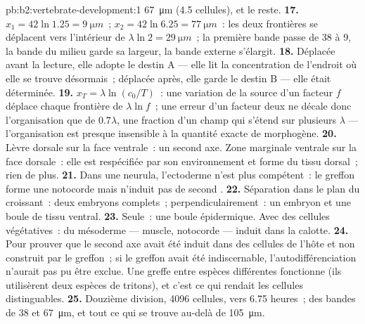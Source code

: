 \begin{solution}{pb:b2:vertebrate-development:1}
\qty{67}{\micro m} (4.5 cellules), et le reste.
\textbf{17.} $x_1 = 42\ln 1.25 = \qty{9}{\micro m}$~; $x_2 = 42\ln 6.25
= \qty{77}{\micro m}$~: les deux frontières se déplacent vers l'intérieur
de $\lambda\ln 2 =
\qty{29}{\micro m}$~; la première bande passe de 38 à 9, la bande du
milieu garde sa largeur, la bande externe s'élargit.
\textbf{18.} Déplacée avant la lecture, elle adopte le destin A ---
elle lit la concentration de l'endroit où elle se trouve désormais~;
déplacée après, elle garde le destin B --- elle était déterminée.
\textbf{19.} $x_T = \lambda\ln(c_0/T)$~: une variation de la source d'un
facteur $f$ déplace chaque frontière de $\lambda\ln f$~; une erreur d'un
facteur deux ne décale donc l'organisation que de $0.7\lambda$, une
fraction d'un champ qui s'étend sur plusieurs $\lambda$ --- l'organisation
est presque insensible à la quantité exacte de morphogène.
\textbf{20.} Lèvre dorsale sur la face ventrale~: un second axe. Zone
marginale ventrale sur la face dorsale~: elle est respécifiée par son
environnement et forme du tissu dorsal~; rien de plus.
\textbf{21.} Dans une neurula, l'ectoderme n'est plus compétent~: le
greffon forme une notocorde mais n'induit pas de second .
\textbf{22.} Séparation dans le plan du croissant~: deux embryons
complets~; perpendiculairement~: un embryon et une boule de tissu
ventral.
\textbf{23.} Seule~: une boule épidermique. Avec des cellules
végétatives~: du mésoderme --- muscle, notocorde --- induit dans la
calotte.
\textbf{24.} Pour prouver que le second axe avait été induit dans des
cellules de l'hôte et non construit par le greffon~; si le greffon avait
été indiscernable, l'autodifférenciation n'aurait pas pu être exclue.
Une greffe entre espèces différentes fonctionne (ils utilisèrent deux
espèces de tritons), et c'est ce qui rendait les cellules
distinguables.
\textbf{25.} Douzième division, 4096 cellules, vers 6.75 heures~; des
bandes de 38 et \qty{67}{\micro m}, et tout ce qui se trouve au-delà de
\qty{105}{\micro m}.
\end{solution}
